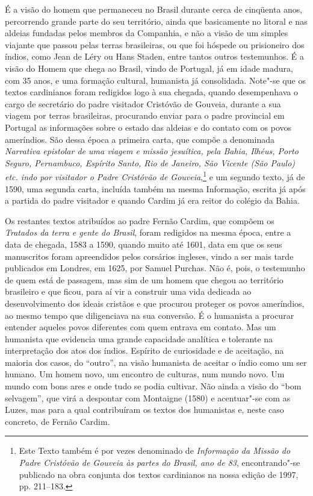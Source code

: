 É a visão do homem que permaneceu no Brasil durante cerca de
cinqüenta anos, percorrendo grande parte do seu território, ainda que
basicamente no litoral e nas aldeias fundadas pelos membros da
Companhia, e não a visão de um simples viajante que passou pelas
terras brasileiras, ou que foi hóspede ou prisioneiro dos índios, como
Jean de Léry ou Hans Staden, entre tantos outros testemunhos. É a visão 
do Homem que chega ao Brasil, vindo de Portugal, já em idade
madura, com 35 anos, e uma formação cultural, humanista já
consolidada. Note"-se que os textos cardinianos foram redigidos logo à
sua chegada, quando desempenhava o cargo de secretário do padre
visitador Cristóvão de Gouveia, durante a sua viagem por terras
brasileiras, procurando enviar para o padre provincial em Portugal as
informações sobre o estado das aldeias e do contato com os povos
ameríndios. São dessa época a primeira carta, que compõe a denominada
\textit{Narrativa epistolar de uma viagem e missão jesuítica, pela
Bahia, Ilhéus, Porto Seguro, Pernambuco, Espírito Santo, Rio de
Janeiro, São Vicente (São Paulo) etc. indo por visitador o
Padre Cristóvão de Gouveia},\footnote{ Este Texto também
é por vezes denominado de \textit{Informação da Missão do Padre
Cristóvão de Gouveia às partes do Brasil, ano de 83}, encontrando"-se
publicado na obra conjunta dos textos cardinianos na nossa edição de 1997, 
pp. 211--183.} e um segundo texto, já de 1590, uma segunda carta, incluída
também na mesma Informação, escrita já após a partida do padre
visitador e quando Cardim já era reitor do colégio da Bahia.

Os restantes textos atribuídos ao padre Fernão Cardim, que compõem os
\textit{Tratados da terra e gente do Brasil}, foram redigidos na mesma
época, entre a data de chegada, 1583 a 1590, quando muito até 1601,
data em que os seus manuscritos foram apreendidos pelos corsários
ingleses, vindo a ser mais tarde publicados em Londres, em 1625, por
Samuel Purchas. Não é, pois, o testemunho de quem está de passagem, mas
sim de um homem que chegou ao território brasileiro e que ficou, para
aí vir a construir uma vida dedicada ao desenvolvimento dos ideais
cristãos e que procurou proteger os povos ameríndios, ao mesmo tempo
que diligenciava na sua conversão. 
É o humanista a procurar entender aqueles povos diferentes com quem
entrava em contato. Mas um humanista que evidencia uma grande
capacidade analítica e tolerante na interpretação dos atos dos índios.
Espírito de curiosidade e de aceitação, na maioria dos casos, do
``outro'', na visão humanista de aceitar o índio como um ser humano. Um
homem novo, um encontro de culturas, num mundo novo. Um mundo com bons
ares e onde tudo se podia cultivar. Não ainda a visão do ``bom
selvagem'', que virá a despontar com Montaigne (1580) e acentuar"-se com
as Luzes, mas para a qual contribuíram os textos dos humanistas e, neste
caso concreto, de Fernão Cardim.


